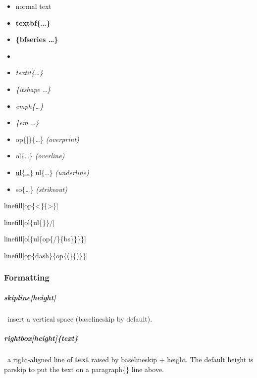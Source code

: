 \documentclass[english,12pt,openany,letterpaper]{book}
\begin{document}
\begin{itemize}
	\item normal text
	\item \textbf{\bs textbf\{\ldots\}}
	\item {\bfseries \{\bs bfseries \ldots\}}
	\item {}
	\item \textit{\bs textit\{\ldots\}}
	\item {\itshape \{\bs itshape \ldots\}}
	\item \emph{\bs emph\{\ldots\}}
	\item {\em \{\bs em \ldots\}}
	
	\item {} \tab\bs op\{|\}\{\ldots\} \textit{(\bs overprint)}
	\item {} \tab\tab\bs ol\{\ldots\} \textit{(\bs overline)}
	\item \ul{\bs ul\{\ldots\}} \tab\tab\bs ul\{\ldots\} \textit{(\bs underline)}
	\item {} \tab\tab\bs so\{\ldots\} \textit{(\bs strikeout)}
\end{itemize}

\skipline

\bs linefill[\bs op\{<\}\{>\}]

\linefill[\op{<}{>}]

\skipline

\bs linefill[\bs ol\{\bs ul\{\tld\}\}/]

\linefill[\ol{\ul{~}}/]

\skipline

\bs linefill[\bs ol\{\bs ul\{\bs op\{/\}\{\bs bs\}\}\}\}]

\linefill[{\ol{\ul{\op{/}{\bs}}}}]

\skipline

\bs linefill[\bs op\{\bs dash\}\{\bs op\{(\}\{)\}\}]

\linefill[\op{\dash}{\op{(}{)}}]

\break


\subsubsection{Formatting}

\subparagraph{\bs skipline[height]} \dash\ insert a vertical space (\bs baselineskip by default).

\subparagraph{\bs rightbox[height]\{text\}} \dash\ a right-aligned line of  \textbf{text} raised by \bs baselineskip + height. The default height is \bs parskip to put the text on a \bs paragraph\{\} line above.
\end{document}
